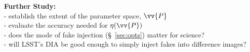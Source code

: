 \documentclass[DM,lsstdraft,toc]{lsstdoc}
\begin{document}
{\bf Further Study:}\\
 - establish the extent of the parameter space, $\vv{P}$\\
 - evaluate the accuracy needed for $\eta(\vv{P})$\\
 - does the mode of fake injection (\S~\ref{sec:opts}) matter for science?\\
 - will LSST's DIA be good enough to simply inject fakes into difference images?\\


\end{document}
